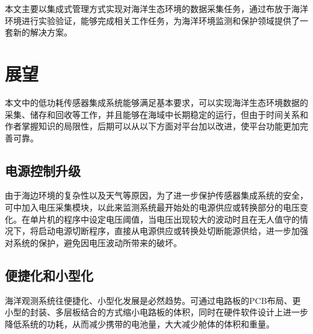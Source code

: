 本文主要以集成式管理方式实现对海洋生态环境的数据采集任务，通过布放于海洋环境进行实验验证，能够完成相关工作任务，为海洋环境监测和保护领域提供了一套新的解决方案。

\section{展望}

本文中的低功耗传感器集成系统能够满足基本要求，可以实现海洋生态环境数据的采集、储存和回收等工作，并且能够在海域中长期稳定的运行，但由于时间关系和作者掌握知识的局限性，后期可以从以下方面对平台加以改进，使平台功能更加完善可靠。

\subsection{电源控制升级}
由于海边环境的复杂性以及天气等原因，为了进一步保护传感器集成系统的安全，可中加入电压采集模块，以此来监测系统最开始处的电源供应或转换部分的电压变化。在单片机的程序中设定电压阈值，当电压出现较大的波动时且在无人值守的情况下，将启动电源切断程序，直接从电源供应或转换处切断能源供给，进一步加强对系统的保护，避免因电压波动所带来的破坏。

\subsection{便捷化和小型化}
海洋观测系统往便捷化、小型化发展是必然趋势。可通过电路板的PCB布局、更小型的封装、多层板结合的方式缩小电路板的体积，同时在硬件软件设计上进一步降低系统的功耗，从而减少携带的电池量，大大减少舱体的体积和重量。